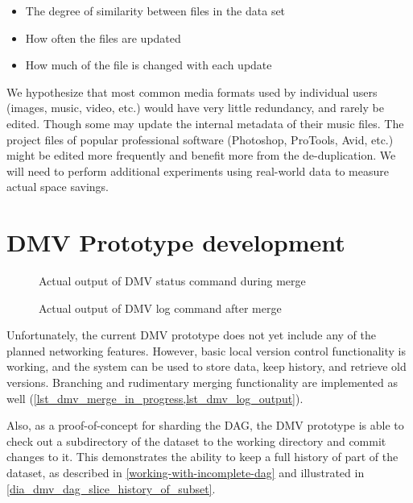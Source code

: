 \begin{itemize}

    \item The degree of similarity between files in the data set

    \item How often the files are updated

    \item How much of the file is changed with each update

\end{itemize}

We hypothesize that most common media formats used by individual users (images,
music, video, etc.) would have very little redundancy, and rarely be edited.
Though some may update the internal metadata of their music files. The project
files of popular professional software (Photoshop, ProTools, Avid, etc.) might
be edited more frequently and benefit more from the de-duplication. We will need
to perform additional experiments using real-world data to measure actual space
savings.

%


\section{DMV Prototype development}

\begin{figure}
    \caption{Actual output of DMV status command during merge}
    \label{lst_dmv_merge_in_progress}
    \centering
\end{figure}

\begin{figure}
    \caption{Actual output of DMV log command after merge}
    \label{lst_dmv_log_output}
    \centering
\end{figure}

Unfortunately, the current \gls{DMV} prototype does not yet include any of the
planned networking features. However, basic local version control functionality
is working, and the system can be used to store data, keep history, and retrieve
old versions. Branching and rudimentary merging functionality are implemented as
well (\cref{lst_dmv_merge_in_progress,lst_dmv_log_output}).

Also, as a proof-of-concept for sharding the DAG, the \gls{DMV} prototype is
able to check out a subdirectory of the dataset to the working directory and
commit changes to it. This demonstrates the ability to keep a full history of
part of the dataset, as described in \autoref{working-with-incomplete-dag} and
illustrated in \autoref{dia_dmv_dag_slice_history_of_subset}.


